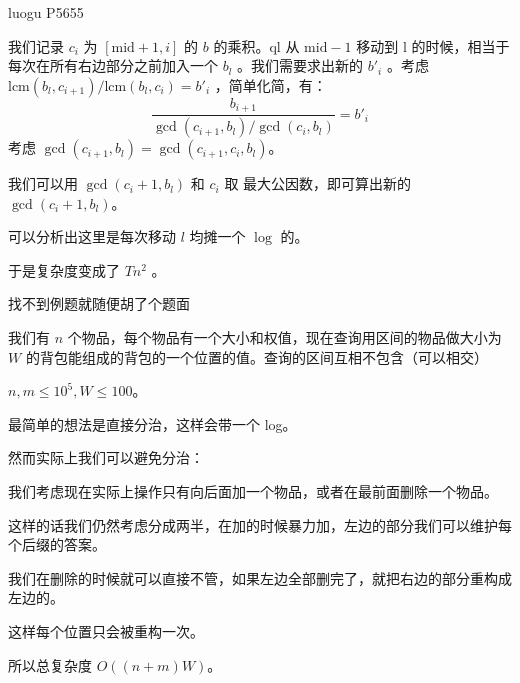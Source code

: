 \documentclass[UTF8,nofonts]{ctexbeamer}
\begin{document}
\begin{frame}{luogu P5655}

我们记录 $c_i$ 为 $[\text{mid} + 1 , i]$ 的 $b$ 的乘积。$\text{ql}$ 从 $\text{mid}-1$ 移动到 $\text{l}$ 的时候，相当于每次在所有右边部分之前加入一个 $b_l$ 。我们需要求出新的 $b'_i$ 。考虑 $\text{lcm}(b_l, c_{i+1})/\text{lcm}(b_l,c_i) = b'_i$ ，简单化简，有：
$$
\frac {b_{i+1}} {\gcd(c_{i+1},b_l)/\gcd(c_i,b_l)} = b'_i
$$
考虑 $\gcd(c_{i+1},b_l)= \gcd(c_{i+1},c_i,b_l)$。

我们可以用 $\gcd(c_i+1,b_l)$ 和 $c_i$ 取 最大公因数，即可算出新的 $\gcd(c_i+1, b_l)$。

可以分析出这里是每次移动 $l$ 均摊一个 $\log$ 的。

于是复杂度变成了 $Tn^2$ 。
\end{frame}

\begin{frame}{找不到例题就随便胡了个题面}

我们有 $n$ 个物品，每个物品有一个大小和权值，现在查询用区间的物品做大小为 $W$ 的背包能组成的背包的一个位置的值。查询的区间互相不包含（可以相交）

$n,m\le 10^5,W\le 100$。

\end{frame}

\begin{frame}
最简单的想法是直接分治，这样会带一个 log。\pause

然而实际上我们可以避免分治：

我们考虑现在实际上操作只有向后面加一个物品，或者在最前面删除一个物品。\pause

这样的话我们仍然考虑分成两半，在加的时候暴力加，左边的部分我们可以维护每个后缀的答案。\pause

我们在删除的时候就可以直接不管，如果左边全部删完了，就把右边的部分重构成左边的。

这样每个位置只会被重构一次。

所以总复杂度 $O((n+m)W)$。
\end{frame}
\end{document}
